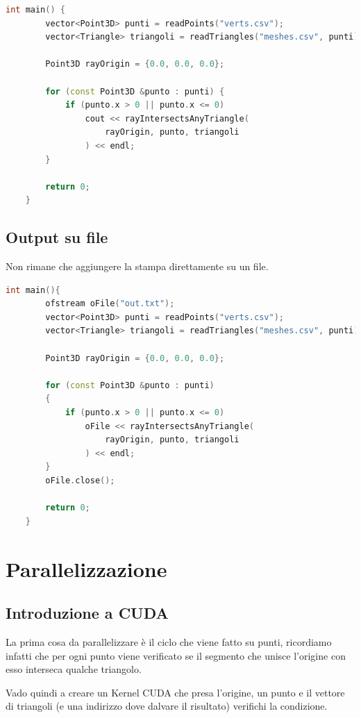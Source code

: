 \documentclass[a4paper]{article}
\begin{document}
\begin{lstlisting}[language=c++]
    int main() {
        vector<Point3D> punti = readPoints("verts.csv");
        vector<Triangle> triangoli = readTriangles("meshes.csv", punti);

        Point3D rayOrigin = {0.0, 0.0, 0.0};

        for (const Point3D &punto : punti) {
            if (punto.x > 0 || punto.x <= 0)
                cout << rayIntersectsAnyTriangle(
                    rayOrigin, punto, triangoli
                ) << endl;
        }
        
        return 0;
    } 
\end{lstlisting}

\subsection{Output su file}

Non rimane che aggiungere la stampa direttamente su un file.

\begin{lstlisting}[language=c++]
    int main(){
        ofstream oFile("out.txt");
        vector<Point3D> punti = readPoints("verts.csv");
        vector<Triangle> triangoli = readTriangles("meshes.csv", punti);
    
        Point3D rayOrigin = {0.0, 0.0, 0.0};
    
        for (const Point3D &punto : punti)
        {
            if (punto.x > 0 || punto.x <= 0)
                oFile << rayIntersectsAnyTriangle(
                    rayOrigin, punto, triangoli
                ) << endl;
        }
        oFile.close();
    
        return 0;
    }
\end{lstlisting}

\newpage

\section{Parallelizzazione}

\subsection{Introduzione a CUDA}
La prima cosa da parallelizzare è il ciclo che viene fatto su punti, ricordiamo infatti che per ogni punto viene verificato se il segmento che unisce l'origine con esso interseca qualche triangolo.

Vado quindi a creare un Kernel CUDA che presa l'origine, un punto e il vettore di triangoli (e una indirizzo dove dalvare il risultato) verifichi la condizione.
\end{document}
